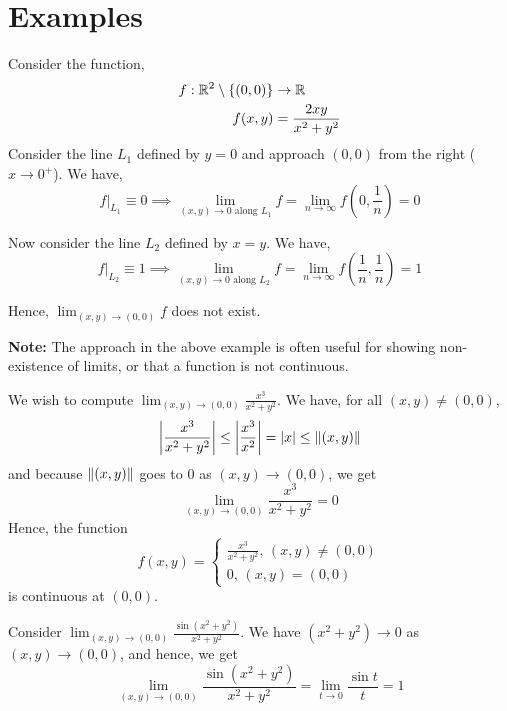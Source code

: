 \documentclass[../Analysis-3.tex]{subfiles}
\begin{document}
\section{Examples}
\begin{Eg}{}{}
  Consider the function,
  \begin{align*}
    f: \mathbb{R}^2 \setminus \{(0,0)\} & \to \mathbb{R}                \\
    f(x,y)                      & = \frac{2xy}{x^2+y^2}
  \end{align*}
  Consider the line $ L_1 $ defined by $ y=0 $ and approach $ (0,0) $ from the right ($ x \longrightarrow 0^{+} $). We have,
  \[ f\big|_{L_1} \equiv 0 \implies \lim_{(x,y) \to 0 \text{ along }L_1} f = \lim_{n \to \infty}f\left(0,\frac 1n\right) =  0 \]

  Now consider the line $ L_2 $ defined by $ x=y $. We have,
  \[ f\big|_{L_2} \equiv 1 \implies \lim_{(x,y) \to 0 \text{ along }L_2} f = \lim_{n \to \infty}f\left(\frac 1n,\frac 1n\right) =  1 \]

  Hence, $ \displaystyle \lim_{(x,y)\to(0,0)}f $ does not exist.
\end{Eg}
\textbf{Note:} The approach in the above example is often useful for showing non-existence of limits, or that a function is not continuous.
\msk

\begin{Eg}{}{}
  We wish to compute $ \displaystyle \lim_{(x,y) \to (0,0)}\frac{x^3}{x^2+y^2} $. We have, for all $ (x,y) \neq (0,0) $,
  \[ \abs{\frac{x^3}{x^2+y^2}} \leq \abs{\frac{x^3}{x^2}} = \abs{x} \leq \norm{(x,y)} \]
  and because $ \norm{(x,y)} $ goes to $ 0 $ as $ (x,y) \longrightarrow (0,0) $, we get
  \[ \displaystyle \lim_{(x,y) \to (0,0)}\frac{x^3}{x^2+y^2} = 0 \]
  Hence, the function
  \[ f(x,y) =
    \begin{cases}
      \frac{x^3}{x^2+y^2}, \, (x,y) \neq (0,0) \\
      0, \, (x,y) = (0,0)
    \end{cases} \]
  is continuous at $ (0,0) $.
\end{Eg}

\begin{Eg}{}{}
  Consider $ \displaystyle \lim_{(x,y) \to (0,0)} \frac{\sin (x^2+y^2)}{x^2+y^2} $. We have $ (x^2+y^2) \longrightarrow 0 $ as $ (x,y) \to (0,0) $, and hence, we get
  \[ \lim_{(x,y) \to (0,0)} \frac{\sin (x^2+y^2)}{x^2+y^2} = \lim_{t \to 0}\frac{\sin t}{t} = 1 \]
\end{Eg}
\pagebreak
\end{document}
